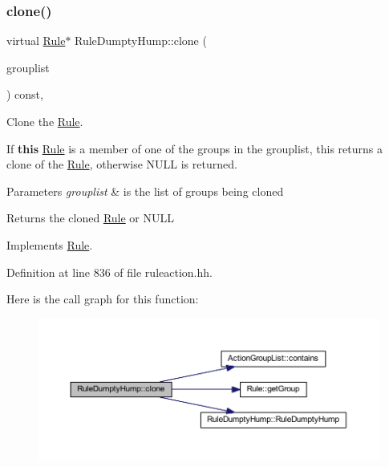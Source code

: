 \subsubsection{\texorpdfstring{clone()}{clone()}}
{\footnotesize\ttfamily virtual \mbox{\hyperlink{class_rule}{Rule}}$\ast$ Rule\+Dumpty\+Hump\+::clone (\begin{DoxyParamCaption}\item[{const \mbox{\hyperlink{class_action_group_list}{Action\+Group\+List}} \&}]{grouplist }\end{DoxyParamCaption}) const\hspace{0.3cm}{\ttfamily [inline]}, {\ttfamily [virtual]}}



Clone the \mbox{\hyperlink{class_rule}{Rule}}. 

If {\bfseries{this}} \mbox{\hyperlink{class_rule}{Rule}} is a member of one of the groups in the grouplist, this returns a clone of the \mbox{\hyperlink{class_rule}{Rule}}, otherwise N\+U\+LL is returned. 
\begin{DoxyParams}{Parameters}
{\em grouplist} & is the list of groups being cloned \\
\hline
\end{DoxyParams}
\begin{DoxyReturn}{Returns}
the cloned \mbox{\hyperlink{class_rule}{Rule}} or N\+U\+LL 
\end{DoxyReturn}


Implements \mbox{\hyperlink{class_rule_a70de90a76461bfa7ea0b575ce3c11e4d}{Rule}}.



Definition at line 836 of file ruleaction.\+hh.

Here is the call graph for this function\+:
\nopagebreak
\begin{figure}[H]
\begin{center}
\leavevmode
\includegraphics[width=350pt]{class_rule_dumpty_hump_af67f659ce222cccd5531261445c70db7_cgraph}
\end{center}
\end{figure}
\mbox{\label{class_rule_dumpty_hump_a4fb2a3c24f0277c40461a7acc76b7e9c}} 
